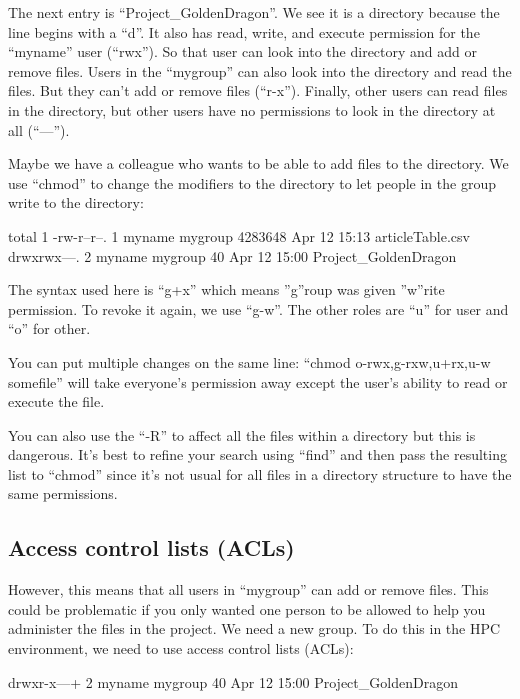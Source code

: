The next entry is ``Project_GoldenDragon''. We see it is a directory because the line begins with a ``d''. It also has read, write, and execute permission for the ``myname'' user (``rwx''). So that user can look into the directory and add or remove files. Users in the ``mygroup'' can also look into the directory and read the files. But they can't add or remove files (``r-x''). Finally, other users can read files in the directory, but other users have no permissions to look in the directory at all (``---'').

Maybe we have a colleague who wants to be able to add files to the directory. We use ``chmod'' to change the modifiers to the directory to let people in the group write to the directory:

\begin{prompt}
    total 1
    -rw-r--r--. 1 myname mygroup 4283648 Apr 12 15:13 articleTable.csv
    drwxrwx---. 2 myname mygroup      40 Apr 12 15:00 Project_GoldenDragon
\end{prompt}

The syntax used here is ``g+x'' which means ''g''roup was given ''w''rite permission. To revoke it again, we use ``g-w''. The other roles are ``u'' for user and ``o'' for other.

You can put multiple changes on the same line: ``chmod o-rwx,g-rxw,u+rx,u-w somefile'' will take everyone's permission away except the user's ability to read or execute the file.

You can also use the ``-R'' to affect all the files within a directory but this is dangerous. It's best to refine your search using ``find'' and then pass the resulting list to ``chmod'' since it's not usual for all files in a directory structure to have the same permissions.

\subsection{Access control lists (ACLs)}

However, this means that all users in ``mygroup'' can add or remove files. This could be problematic if you only wanted one person to be allowed to help you administer the files in the project. We need a new group. To do this in the HPC environment, we need to use access control lists (ACLs):

\begin{prompt}
    drwxr-x---+ 2 myname mygroup      40 Apr 12 15:00 Project_GoldenDragon
\end{prompt}

